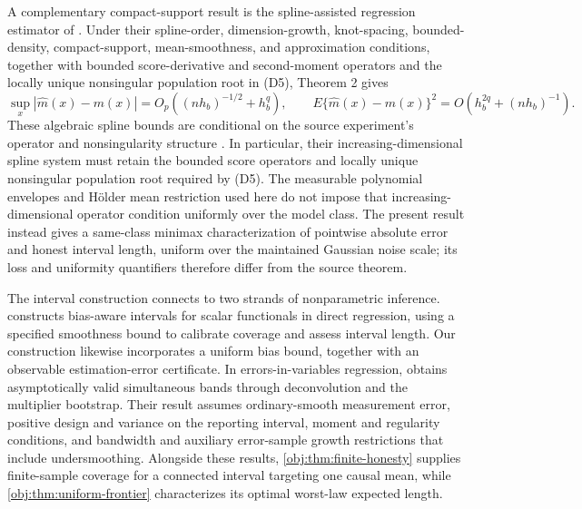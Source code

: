 A complementary compact-support result is the spline-assisted regression estimator of \citet{JiangMaCarroll2026}. Under their spline-order, dimension-growth, knot-spacing, bounded-density, compact-support, mean-smoothness, and approximation conditions, together with bounded score-derivative and second-moment operators and the locally unique nonsingular population root in (D5), Theorem 2 gives
\[
\sup_x |\widehat m(x)-m(x)|
=O_p\!\left((nh_b)^{-1/2}+h_b^q\right),
\qquad
E\{\widehat m(x)-m(x)\}^2
=O\!\left(h_b^{2q}+(nh_b)^{-1}\right).
\]
These algebraic spline bounds are conditional on the source experiment's operator and nonsingularity structure \citep[Theorem 2, conditions (C2)--(C4) and (D1)--(D5)]{JiangMaCarroll2026}. In particular, their increasing-dimensional spline system must retain the bounded score operators and locally unique nonsingular population root required by (D5). The measurable polynomial envelopes and Hölder mean restriction used here do not impose that increasing-dimensional operator condition uniformly over the model class. The present result instead gives a same-class minimax characterization of pointwise absolute error and honest interval length, uniform over the maintained Gaussian noise scale; its loss and uniformity quantifiers therefore differ from the source theorem.

The interval construction connects to two strands of nonparametric inference. \citet[Sections 2--3]{ArmstrongKolesar2020} constructs bias-aware intervals for scalar functionals in direct regression, using a specified smoothness bound to calibrate coverage and assess interval length. Our construction likewise incorporates a uniform bias bound, together with an observable estimation-error certificate. In errors-in-variables regression, \citet[Assumption 3.1 and Theorem 3.2]{KatoSasaki2019} obtains asymptotically valid simultaneous bands through deconvolution and the multiplier bootstrap. Their result assumes ordinary-smooth measurement error, positive design and variance on the reporting interval, moment and regularity conditions, and bandwidth and auxiliary error-sample growth restrictions that include undersmoothing. Alongside these results, \cref{obj:thm:finite-honesty} supplies finite-sample coverage for a connected interval targeting one causal mean, while \cref{obj:thm:uniform-frontier} characterizes its optimal worst-law expected length.

